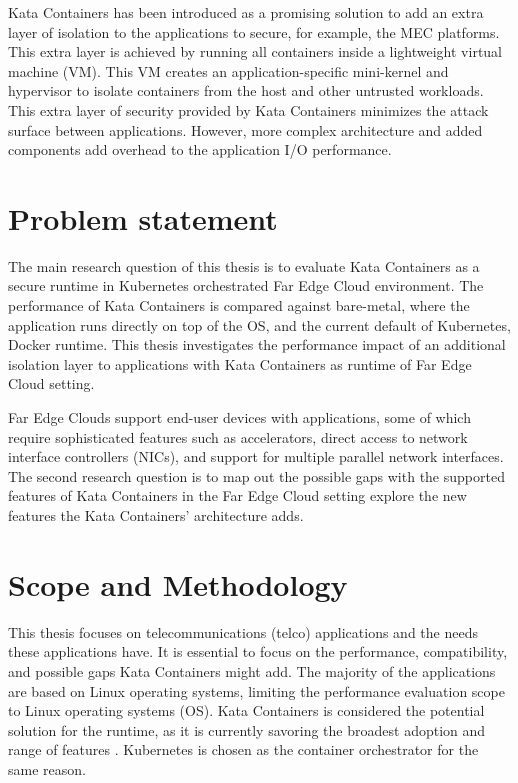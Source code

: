 Kata Containers \cite{KataContainers} has been introduced as a promising solution to add an extra layer of isolation to the applications to secure, for example, the MEC platforms. This extra layer is achieved by running all containers inside a lightweight virtual machine (VM). This VM creates an application-specific mini-kernel and hypervisor to isolate containers from the host and other untrusted workloads. This extra layer of security provided by Kata Containers minimizes the attack surface between applications. However, more complex architecture and added components add overhead to the application I/O performance.

\section{Problem statement}
\label{section:intro_problemstatement}

The main research question of this thesis is to evaluate Kata Containers as a secure runtime in Kubernetes orchestrated Far Edge Cloud environment. The performance of Kata Containers is compared against bare-metal, where the application runs directly on top of the OS, and the current default of Kubernetes, Docker runtime. This thesis investigates the performance impact of an additional isolation layer to applications with Kata Containers as runtime of Far Edge Cloud setting.

Far Edge Clouds support end-user devices with applications, some of which require sophisticated features such as accelerators, direct access to network interface controllers (NICs), and support for multiple parallel network interfaces. The second research question is to map out the possible gaps with the supported features of Kata Containers in the Far Edge Cloud setting explore the new features the Kata Containers' architecture adds.

\section{Scope and Methodology}
\label{section:intro_scopemethodology}

This thesis focuses on telecommunications (telco) applications and the needs these applications have. It is essential to focus on the performance, compatibility, and possible gaps Kata Containers might add. The majority of the applications are based on Linux operating systems, limiting the performance evaluation scope to Linux operating systems (OS). Kata Containers is considered the potential solution for the runtime, as it is currently savoring the broadest adoption and range of features \cite{Flauzac2020}. Kubernetes is chosen as the container orchestrator for the same reason.

